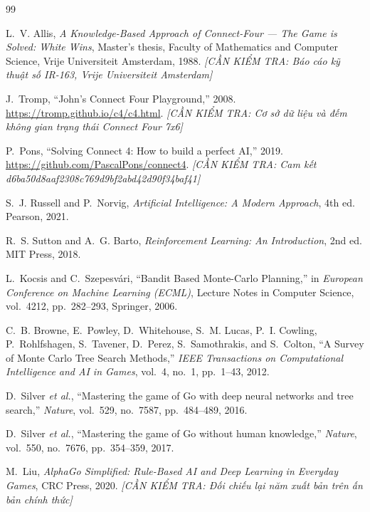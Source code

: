\documentclass[11pt, a4paper]{article}
\begin{document}
\newpage
\begin{thebibliography}{99}

L.~V. Allis, \textit{A Knowledge-Based Approach of Connect-Four --- The Game is Solved: White Wins}, Master's thesis, Faculty of Mathematics and Computer Science, Vrije Universiteit Amsterdam, 1988.
\textit{[CẦN KIỂM TRA: Báo cáo kỹ thuật số IR-163, Vrije Universiteit Amsterdam]}

J.~Tromp, ``John's Connect Four Playground,'' 2008. \url{https://tromp.github.io/c4/c4.html}.
\textit{[CẦN KIỂM TRA: Cơ sở dữ liệu và đếm không gian trạng thái Connect Four 7x6]}

P.~Pons, ``Solving Connect 4: How to build a perfect AI,'' 2019. \url{https://github.com/PascalPons/connect4}.
\textit{[CẦN KIỂM TRA: Cam kết d6ba50d8aaf2308c769d9bf2abd42d90f34baf41]}

S.~J. Russell and P.~Norvig, \textit{Artificial Intelligence: A Modern Approach}, 4th ed. Pearson, 2021.

R.~S. Sutton and A.~G. Barto, \textit{Reinforcement Learning: An Introduction}, 2nd ed. MIT Press, 2018.

L.~Kocsis and C.~Szepesv{\'a}ri, ``Bandit Based Monte-Carlo Planning,'' in \textit{European Conference on Machine Learning (ECML)}, Lecture Notes in Computer Science, vol.~4212, pp.~282--293, Springer, 2006.

C.~B. Browne, E.~Powley, D.~Whitehouse, S.~M. Lucas, P.~I. Cowling, P.~Rohlfshagen, S.~Tavener, D.~Perez, S.~Samothrakis, and S.~Colton, ``A Survey of Monte Carlo Tree Search Methods,'' \textit{IEEE Transactions on Computational Intelligence and AI in Games}, vol.~4, no.~1, pp.~1--43, 2012.

D.~Silver \textit{et al.}, ``Mastering the game of Go with deep neural networks and tree search,'' \textit{Nature}, vol.~529, no.~7587, pp.~484--489, 2016.

D.~Silver \textit{et al.}, ``Mastering the game of Go without human knowledge,'' \textit{Nature}, vol.~550, no.~7676, pp.~354--359, 2017.

M.~Liu, \textit{AlphaGo Simplified: Rule-Based AI and Deep Learning in Everyday Games}, CRC Press, 2020.
\textit{[CẦN KIỂM TRA: Đối chiếu lại năm xuất bản trên ấn bản chính thức]}

\end{thebibliography}
\end{document}
